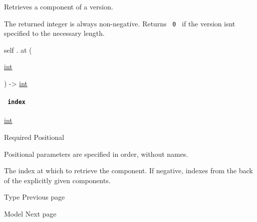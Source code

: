 Retrieves a component of a version.

The returned integer is always non-negative. Returns \texttt{\ 0\ } if
the version isn\textquotesingle t specified to the necessary length.

self { . } { at } (

{ \href{/docs/reference/foundations/int/}{int} }

) -\textgreater{} \href{/docs/reference/foundations/int/}{int}

\paragraph{\texorpdfstring{\texttt{\ index\ }}{ index }}\label{definitions-at-index}

\href{/docs/reference/foundations/int/}{int}

{Required} {{ Positional }}

\label{definitions-at-index-positional-tooltip}
Positional parameters are specified in order, without names.

The index at which to retrieve the component. If negative, indexes from
the back of the explicitly given components.

\href{/docs/reference/foundations/type/}{\pandocbounded{}}

{ Type } { Previous page }

\href{/docs/reference/model/}{\pandocbounded{}}

{ Model } { Next page }

